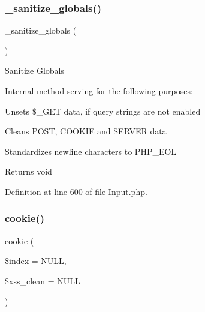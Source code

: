 \mbox{\label{class_c_i___input_aadbb0e5cbf9b5783c872cb402ea6a2fa}} 
\subsubsection{\texorpdfstring{\_sanitize\_globals()}{\_sanitize\_globals()}}
{\footnotesize\ttfamily \+\_\+sanitize\+\_\+globals (\begin{DoxyParamCaption}{ }\end{DoxyParamCaption})\hspace{0.3cm}{\ttfamily [protected]}}

Sanitize Globals

Internal method serving for the following purposes\+:


\begin{DoxyItemize}
\item Unsets \$\+\_\+\+G\+ET data, if query strings are not enabled
\item Cleans P\+O\+ST, C\+O\+O\+K\+IE and S\+E\+R\+V\+ER data
\begin{DoxyItemize}
\item Standardizes newline characters to P\+H\+P\+\_\+\+E\+OL
\end{DoxyItemize}
\end{DoxyItemize}

\begin{DoxyReturn}{Returns}
void 
\end{DoxyReturn}


Definition at line 600 of file Input.\+php.

\mbox{\label{class_c_i___input_a473ce915ac81faa466ca351dacae799d}} 
\subsubsection{\texorpdfstring{cookie()}{cookie()}}
{\footnotesize\ttfamily cookie (\begin{DoxyParamCaption}\item[{}]{\$index = {\ttfamily NULL},  }\item[{}]{\$xss\+\_\+clean = {\ttfamily NULL} }\end{DoxyParamCaption})}

